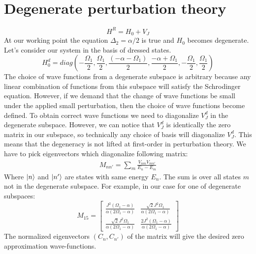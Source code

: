 \documentclass[%
 aip,
 amsmath,amssymb,
 reprint,%
]{revtex4-1}
\begin{document}
\section{Degenerate perturbation theory}
\begin{equation}
H^R=H_0+V_J
\end{equation}
At our working point the equation $\Delta_2=\alpha/2$ is true and $H_0$ becomes degenerate. Let's consider our system in the basis of dressed states.
\begin{equation}
H_0^{d}= diag(-\frac{\Omega_{1}}{2},\frac{\Omega_{1}}{2},\frac{(-\alpha-\Omega_{1})}{2},\frac{-\alpha+\Omega_{1}}{2},-\frac{\Omega_{1}}{2},\frac{\Omega_{1}}{2})
\end{equation}
The choice of wave functions from a degenerate subspace is arbitrary because any linear combination of functions from this subspace will satisfy the Schrodinger equation. However, if we demand that the change of wave functions be small under the applied small perturbation, then the choice of wave functions become defined. To obtain correct wave functions we need to diagonalize $V_J^{d}$ in the degenerate subspace. However, we can notice that $V_J^{d}$ is identically the zero matrix in our subspace, so technically any choice of basis will diagonalize $V_J^{d}$. This means that the degeneracy is not lifted at first-order in perturbation theory. We have to pick eigenvectors which diagonalize following matrix:
\begin{equation}
	\begin{matrix}
	M_{nn'} = \sum_{m}\frac{V_{nm}V_{mn'}}{E_n-E_m}
	\end{matrix}
\end{equation}
Where $\ket{n}$ and $\ket{n'}$ are states with same energy $E_n$.  The sum is over all states $m$ not in the degenerate subspace.
For example, in our case for one of degenerate subspaces:
\begin{equation}
	M_{15} =\left[\begin{matrix}\frac{J^{2} \left(\Omega_{1} - \alpha\right)}{\alpha \left(2 \Omega_{1} - \alpha\right)} & \frac{\sqrt{2} J^{2} \Omega_{1}}{\alpha \left(2 \Omega_{1} - \alpha\right)}\\\frac{\sqrt{2} J^{2} \Omega_{1}}{\alpha \left(2 \Omega_{1} - \alpha\right)} & \frac{2 J^{2} \left(\Omega_{1} - \alpha\right)}{\alpha \left(2 \Omega_{1} - \alpha\right)}\end{matrix}\right]
\end{equation}
The normalized eigenvectors $(C_n,C_{n'})$ of the matrix will give the desired zero approximation wave-functions.
\end{document}
